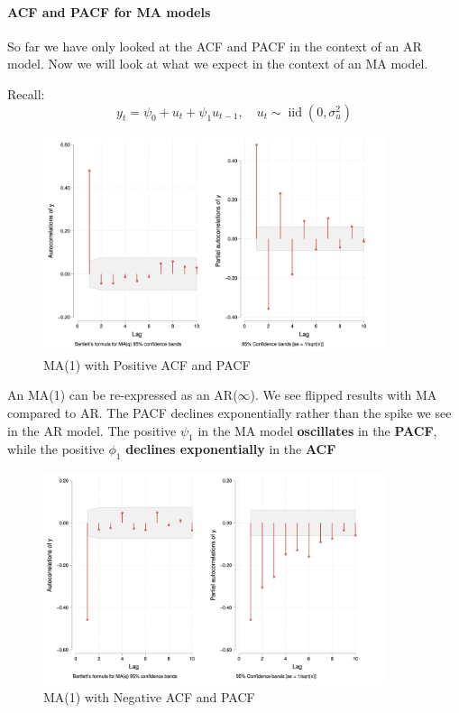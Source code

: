 \documentclass[11pt]{article}
\begin{document}
\paragraph{ACF and PACF for MA models}
So far we have only looked at the ACF and PACF in the context of an AR model. Now we will look at what we expect in the context of an MA model.

Recall:
\begin{equation}
y_t=\psi_0+u_t+\psi_1 u_{t-1}, \quad u_t \sim \operatorname{iid}\left(0, \sigma_u^2\right)
\end{equation}

\begin{figure}[ht]
    \centering
    \includegraphics[width=10cm]{pics/ma positive.png}
    \caption{MA(1) with Positive ACF and PACF }
    \label{fig:ma acf pacf positive}
\end{figure}

\begin{note}
    An MA(1) can be re-expressed as an AR($\infty$). We see flipped results with MA compared to AR. The PACF declines exponentially rather than the spike we see in the AR model. The positive $\psi_1$ in the MA model \textbf{oscillates} in the \textbf{PACF}, while the positive $\phi_1$ \textbf{declines exponentially} in the \textbf{ACF}
\end{note}

\begin{figure}[ht]
    \centering
    \includegraphics[width=10cm]{pics/ma negative.png}
    \caption{MA(1) with Negative ACF and PACF }
    \label{fig:ma acf pacf negative}
\end{figure}
\end{document}
